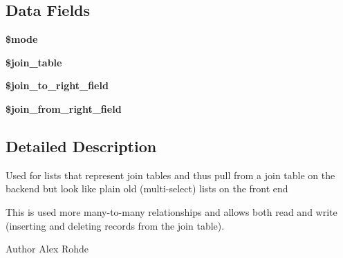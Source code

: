 \subsection*{\-Data \-Fields}
\begin{DoxyCompactItemize}
\item 
\hypertarget{class_ac_list_join_a3aaf40baac36e278c7d7c9139df1750c}{{\bfseries \$mode}}\label{class_ac_list_join_a3aaf40baac36e278c7d7c9139df1750c}

\item 
\hypertarget{class_ac_list_join_a22580c10f61d67a5ca65053fed97243b}{{\bfseries \$join\-\_\-table}}\label{class_ac_list_join_a22580c10f61d67a5ca65053fed97243b}

\item 
\hypertarget{class_ac_list_join_a96331f416277efdc0680b0c7efa00816}{{\bfseries \$join\-\_\-to\-\_\-right\-\_\-field}}\label{class_ac_list_join_a96331f416277efdc0680b0c7efa00816}

\item 
\hypertarget{class_ac_list_join_a7166a2effac8ba211eb77962a0fbce08}{{\bfseries \$join\-\_\-from\-\_\-right\-\_\-field}}\label{class_ac_list_join_a7166a2effac8ba211eb77962a0fbce08}

\end{DoxyCompactItemize}


\subsection{\-Detailed \-Description}
\-Used for lists that represent join tables and thus pull from a join table on the backend but look like plain old (multi-\/select) lists on the front end

\-This is used more many-\/to-\/many relationships and allows both read and write (inserting and deleting records from the join table).

\begin{DoxyAuthor}{\-Author}
\-Alex \-Rohde 
\end{DoxyAuthor}


